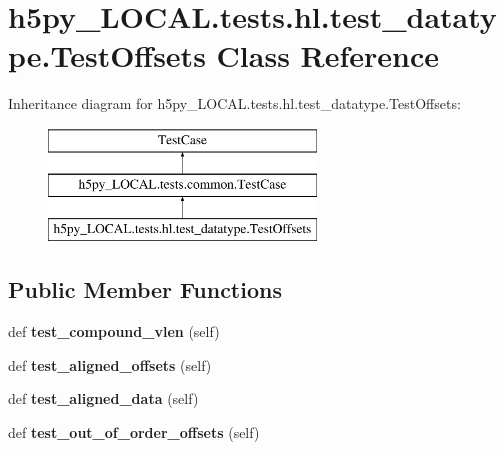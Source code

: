 \hypertarget{classh5py__LOCAL_1_1tests_1_1hl_1_1test__datatype_1_1TestOffsets}{}\section{h5py\+\_\+\+L\+O\+C\+A\+L.\+tests.\+hl.\+test\+\_\+datatype.\+Test\+Offsets Class Reference}
\label{classh5py__LOCAL_1_1tests_1_1hl_1_1test__datatype_1_1TestOffsets}
Inheritance diagram for h5py\+\_\+\+L\+O\+C\+A\+L.\+tests.\+hl.\+test\+\_\+datatype.\+Test\+Offsets\+:\begin{figure}[H]
\begin{center}
\leavevmode
\includegraphics[height=3.000000cm]{classh5py__LOCAL_1_1tests_1_1hl_1_1test__datatype_1_1TestOffsets}
\end{center}
\end{figure}
\subsection*{Public Member Functions}
\begin{DoxyCompactItemize}
\item 
\mbox{\label{classh5py__LOCAL_1_1tests_1_1hl_1_1test__datatype_1_1TestOffsets_a69a39476c419a6eced5fbdd6315f9d60}} 
def {\bfseries test\+\_\+compound\+\_\+vlen} (self)
\item 
\mbox{\label{classh5py__LOCAL_1_1tests_1_1hl_1_1test__datatype_1_1TestOffsets_a763a235dacdd544f63bbc2abd0011c60}} 
def {\bfseries test\+\_\+aligned\+\_\+offsets} (self)
\item 
\mbox{\label{classh5py__LOCAL_1_1tests_1_1hl_1_1test__datatype_1_1TestOffsets_af630439a978c97885124d8c5a28ff877}} 
def {\bfseries test\+\_\+aligned\+\_\+data} (self)
\item 
\mbox{\label{classh5py__LOCAL_1_1tests_1_1hl_1_1test__datatype_1_1TestOffsets_a87e04ea7c3bfe21ff6def14fccb77012}} 
def {\bfseries test\+\_\+out\+\_\+of\+\_\+order\+\_\+offsets} (self)
\end{DoxyCompactItemize}
